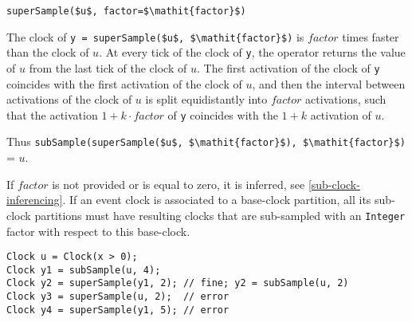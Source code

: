 \begin{operatordefinition}[superSample]
\begin{synopsis}\begin{lstlisting}
superSample($u$, factor=$\mathit{factor}$)
\end{lstlisting}\end{synopsis}
\begin{semantics}
The clock of \lstinline!y = superSample($u$, $\mathit{factor}$)! is $\mathit{factor}$ times faster than the clock of $u$.  At every tick of the clock of \lstinline!y!, the operator returns the value of $u$ from the last tick of the clock of $u$.  The first activation of the clock of \lstinline!y! coincides with the first activation of the clock of $u$, and then the interval between activations of the clock of $u$ is split equidistantly into $\mathit{factor}$ activations, such that the activation $1 + k \cdot \mathit{factor}$ of \lstinline!y! coincides with the $1 + k$ activation of $u$.
\begin{nonnormative}
Thus \lstinline!subSample(superSample($u$, $\mathit{factor}$), $\mathit{factor}$)! = $u$.
\end{nonnormative}
If $\mathit{factor}$ is not provided or is equal to zero, it is inferred, see \cref{sub-clock-inferencing}.
If an event clock is associated to a base-clock partition, all its sub-clock partitions must have resulting clocks that are sub-sampled with an \lstinline!Integer! factor with respect to this base-clock.

\begin{example}
\begin{lstlisting}[language=modelica]
Clock u = Clock(x > 0);
Clock y1 = subSample(u, 4);
Clock y2 = superSample(y1, 2); // fine; y2 = subSample(u, 2)
Clock y3 = superSample(u, 2);  // error
Clock y4 = superSample(y1, 5); // error
\end{lstlisting}
\end{example}
\end{semantics}
\end{operatordefinition}

